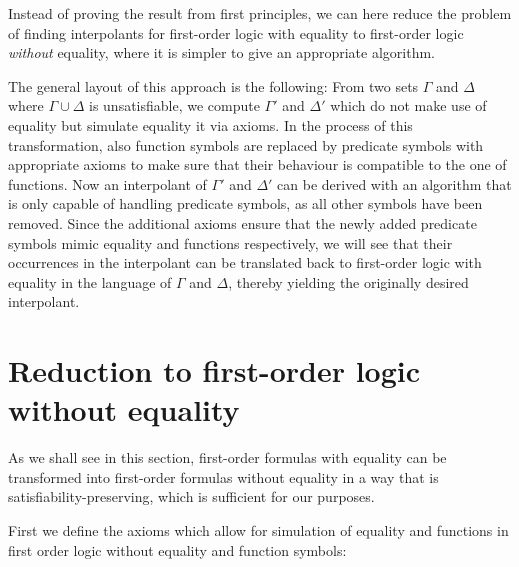
Instead of proving the result from first principles, we can here reduce the problem of finding interpolants for first-order logic with equality to first-order logic \emph{without} equality, where it is simpler to give an appropriate algorithm.

The general layout of this approach is the following:
From two sets $\Gamma$ and $\Delta$ where $\Gamma \cup \Delta$ is unsatisfiable, we compute $\Gamma'$ and $\Delta'$ which do not make use of equality but simulate equality it via axioms.
In the process of this transformation, also function symbols are replaced by predicate symbols with appropriate axioms to make sure that their behaviour is compatible to the one of functions.
Now an interpolant of $\Gamma'$ and $\Delta'$ can be derived with an algorithm that is only capable of handling predicate symbols, as all other symbols have been removed.
Since the additional axioms ensure that the newly added predicate symbols mimic equality and functions respectively, we will see that their occurrences in the interpolant can be translated back to first-order logic with equality in the language of $\Gamma$ and $\Delta$, thereby yielding the originally desired interpolant.


\section{Reduction to first-order logic without equality}

As we shall see in this section, first-order formulas with equality can be transformed into first-order formulas without equality in a way that is satisfiability-preserving, which is sufficient for our purposes.

First we define the axioms which allow for simulation of equality and functions in first order logic without equality and function symbols:

